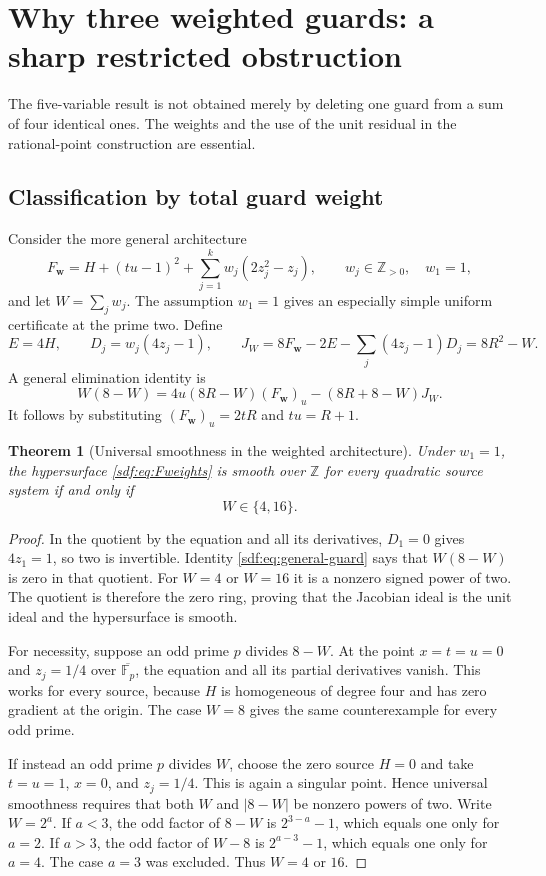 \documentclass[11pt,a4paper]{article}
\newtheorem{theorem}{Theorem}[section]
\theoremstyle{definition}
\theoremstyle{remark}
\newcommand{\Z}{\mathbb Z}
\newcommand{\Fp}{\mathbb F_p}
\begin{document}
\section{Why three weighted guards: a sharp restricted obstruction}\label{sdf:sec:guards}

The five-variable result is not obtained merely by deleting one guard from
a sum of four identical ones. The weights and the use of the unit residual
in the rational-point construction are essential.

\subsection{Classification by total guard weight}

Consider the more general architecture
\begin{equation}\label{sdf:eq:Fweights}
 F_{\mathbf w}=H+(tu-1)^2+\sum_{j=1}^k w_j(2z_j^2-z_j),
 \qquad w_j\in\Z_{>0},\quad w_1=1,
\end{equation}
and let $W=\sum_jw_j$. The assumption $w_1=1$ gives an especially simple
uniform certificate at the prime two. Define
\[
 E=4H,\qquad D_j=w_j(4z_j-1),\qquad
 J_W=8F_{\mathbf w}-2E-\sum_j(4z_j-1)D_j=8R^2-W.
\]
A general elimination identity is
\begin{equation}\label{sdf:eq:general-guard}
 W(8-W)=4u(8R-W)(F_{\mathbf w})_u-(8R+8-W)J_W.
\end{equation}
It follows by substituting $(F_{\mathbf w})_u=2tR$ and $tu=R+1$.

\begin{theorem}[Universal smoothness in the weighted architecture]\label{sdf:thm:weights}
Under $w_1=1$, the hypersurface \eqref{sdf:eq:Fweights} is smooth over $\Z$
for \emph{every} quadratic source system if and only if
\[
 W\in\{4,16\}.
\]
\end{theorem}
\begin{proof}
In the quotient by the equation and all its derivatives, $D_1=0$ gives
$4z_1=1$, so two is invertible. Identity \eqref{sdf:eq:general-guard} says that
$W(8-W)$ is zero in that quotient. For $W=4$ or $W=16$ it is a nonzero
signed power of two. The quotient is therefore the zero ring, proving that
the Jacobian ideal is the unit ideal and the hypersurface is smooth.

For necessity, suppose an odd prime $p$ divides $8-W$. At the point
$x=t=u=0$ and $z_j=1/4$ over $\overline{\Fp}$, the equation and all its
partial derivatives vanish. This works for every source, because $H$ is
homogeneous of degree four and has zero gradient at the origin. The case
$W=8$ gives the same counterexample for every odd prime.

If instead an odd prime $p$ divides $W$, choose the zero source $H=0$ and
take $t=u=1$, $x=0$, and $z_j=1/4$. This is again a singular point. Hence
universal smoothness requires that both $W$ and $|8-W|$ be nonzero powers
of two. Write $W=2^a$. If $a<3$, the odd factor of $8-W$ is
$2^{3-a}-1$, which equals one only for $a=2$. If $a>3$, the odd factor of
$W-8$ is $2^{a-3}-1$, which equals one only for $a=4$. The case $a=3$
was excluded. Thus $W=4$ or $16$.
\end{proof}
\end{document}
